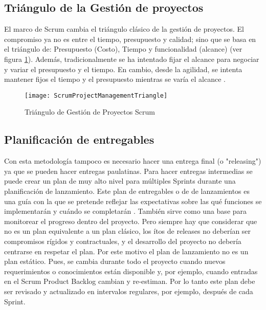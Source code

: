 \subsection{Triángulo de la Gestión de proyectos}

El marco de Scrum cambia el triángulo clásico de la gestión de proyectos. El compromiso ya no es entre el tiempo, presupuesto y calidad; sino que se basa en el triángulo de: Presupuesto (Costo), Tiempo y funcionalidad (alcance) (ver figura \ref{fig:ScrumProjectManagementTriangle}). Además, tradicionalmente se ha intentado fijar el alcance para negociar y variar el presupuesto y el tiempo. En cambio, desde la agilidad, se intenta mantener fijos el tiempo y el presupuesto mientras se varía el alcance \cite{Martin-Alaimo-2014}.

\begin{figure}[h]
  \centering
  \texttt{[image: ScrumProjectManagementTriangle]}
  \caption{Triángulo de Gestión de Proyectos Scrum}
  \centering
  \label{fig:ScrumProjectManagementTriangle} %
\end{figure}

\subsection{Planificación de entregables}

Con esta metodología tampoco es necesario hacer una entrega final (o "releasing") ya que se pueden hacer entregas paulatinas. Para hacer entregas intermedias se puede crear un plan de muy alto nivel para múltiples Sprints durante una planificación de lanzamiento. Este plan de entregables o de de lanzamientos es una guía con la que se pretende reflejar las expectativas sobre las qué funciones se implementarán y cuándo se completarán \cite{Scrum-Institute-2015}. También sirve como una base para monitorear el progreso dentro del proyecto. Pero siempre hay que considerar que no es un plan equivalente a un plan clásico, los ítos de releases no deberían ser compromisos rígidos y contractuales, y el desarrollo del proyecto no debería centrarse en respetar el plan. Por este motivo el plan de lanzamiento no es un plan estático. Pues, se cambia durante todo el proyecto cuando nuevos requerimientos o conocimientos están disponible y, por ejemplo, cuando entradas en el Scrum Product Backlog cambian y re-estiman. Por lo tanto este plan debe ser revisado y actualizado en intervalos regulares, por ejemplo, después de cada Sprint.


